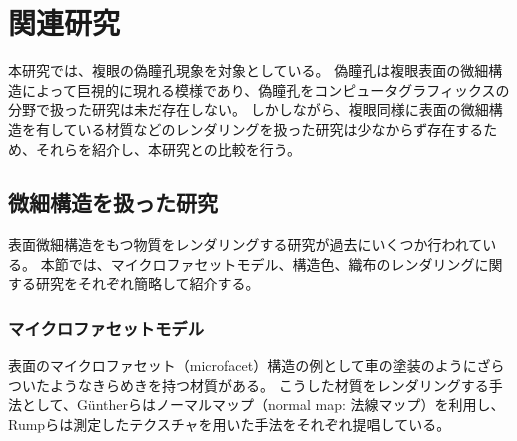 \chapter{関連研究}
\label{CRelatedWork}

本研究では、複眼の偽瞳孔現象を対象としている。
偽瞳孔は複眼表面の微細構造によって巨視的に現れる模様であり、偽瞳孔をコンピュータグラフィックスの分野で扱った研究は未だ存在しない。
しかしながら、複眼同様に表面の微細構造を有している材質などのレンダリングを扱った研究は少なからず存在するため、それらを紹介し、本研究との比較を行う。

\section{微細構造を扱った研究}
\label{SMicrostructure}

表面微細構造をもつ物質をレンダリングする研究が過去にいくつか行われている。
本節では、マイクロファセットモデル、構造色、織布のレンダリングに関する研究をそれぞれ簡略して紹介する。

\subsection{マイクロファセットモデル}

表面のマイクロファセット（microfacet）構造の例として車の塗装のようにざらついたようなきらめきを持つ材質がある。
こうした材質をレンダリングする手法として、G\"{u}ntherら\cite{}はノーマルマップ（normal map: 法線マップ）を利用し、Rumpら\cite{rump-2008-photo-realistic}は測定したテクスチャを用いた手法をそれぞれ提唱している。

